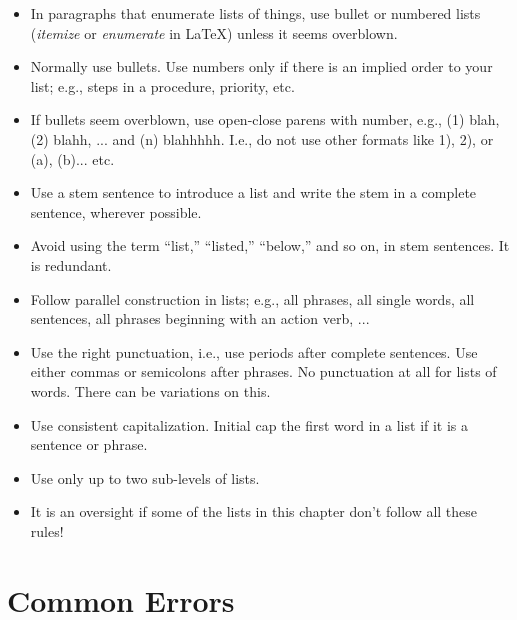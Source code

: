 \begin{itemize}
\item In paragraphs that enumerate lists of things, use bullet or numbered lists (\textit{itemize} or \textit{enumerate} in LaTeX) unless it seems overblown.
\item Normally use bullets. Use numbers only if there is an implied order to your list; e.g., steps in a procedure, priority, etc.
\item If bullets seem overblown,  use open-close parens with number, e.g., (1) blah, (2) blahh, ... and (n) blahhhhh. I.e., do not use other formats like 1), 2), or (a), (b)... etc.
\item Use a stem sentence to introduce a list and write the stem in a complete sentence, wherever possible.
\item Avoid using the term ``list,'' ``listed,'' ``below,'' and so on, in stem sentences. It is redundant. 
\item Follow parallel construction in lists; e.g., all phrases, all single words, all sentences, all phrases beginning with an action verb, ...
\item Use the right punctuation, i.e., use periods after complete sentences. Use either commas or semicolons after phrases. No punctuation at all for lists of words. There can be variations on this.
\item Use consistent capitalization. Initial cap the first word in a list if it is a sentence or phrase. 
\item Use only up to two sub-levels of lists.
\item It is an oversight if some of the lists in this chapter don't follow all these rules!
\end{itemize}

\section{Common Errors}
\label{sec:english-errors}

